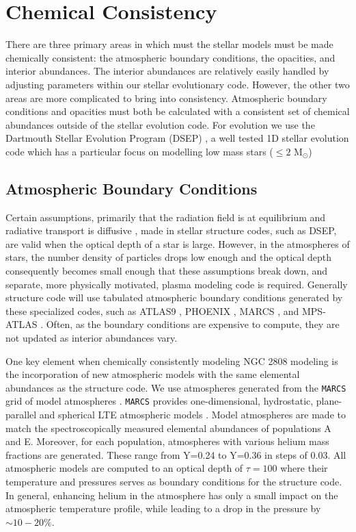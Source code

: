 \section{Chemical Consistency}\label{sec:const}
There are three primary areas in which must the stellar models must be made
chemically consistent: the atmospheric boundary conditions, the opacities, and
interior abundances. The interior abundances are relatively easily handled by
adjusting parameters within our stellar evolutionary code. However, the other
two areas are more complicated to bring into consistency. Atmospheric boundary
conditions and opacities must both be calculated with a consistent set of
chemical abundances outside of the stellar evolution code. For evolution we use
the Dartmouth Stellar Evolution Program (DSEP) \citep{Dotter2008}, a well
tested 1D stellar evolution code which has a particular focus on modelling low
mass stars ($\le 2$ M$_{\odot}$)

\subsection{Atmospheric Boundary Conditions}\label{sec:atm}
Certain assumptions, primarily that the radiation field is at equilibrium and
radiative transport is diffusive \citep{Salaris2005}, made in stellar structure
codes, such as DSEP, are valid when the optical depth of a star is large.
However, in the atmospheres of stars, the number density of particles drops low
enough and the optical depth consequently becomes small enough that these
assumptions break down, and separate, more physically motivated, plasma
modeling code is required. Generally structure code will use tabulated
atmospheric boundary conditions generated by these specialized codes, such as ATLAS9
\citep{Kurucz1993}, PHOENIX \citep{Husser2013}, MARCS \citep{Gustafsson2008},
and MPS-ATLAS \citep{Kostogryz2023}. Often, as the boundary conditions are
expensive to compute, they are not updated as interior abundances vary. 

One key element when chemically consistently modeling NGC 2808 modeling is the
incorporation of new atmospheric models with the same elemental abundances as
the structure code. We use atmospheres generated from the \texttt{MARCS} grid
of model atmospheres \citep{Plez2008}. \texttt{MARCS} provides one-dimensional,
hydrostatic, plane-parallel and spherical LTE atmospheric models
\citep{Gustafsson2008}. Model atmospheres are made to match the
spectroscopically measured elemental abundances of populations A and E.
Moreover, for each population, atmospheres with various helium mass fractions
are generated. These range from Y=0.24 to Y=0.36 in steps of 0.03. All
atmospheric models are computed to an optical depth of $\tau = 100$ where their
temperature and pressures serves as boundary conditions for the structure code.
In general, enhancing helium in the atmosphere has only a small impact on the atmospheric
temperature profile, while leading to a drop in the pressure by $\sim 10 - 20 \%$.


